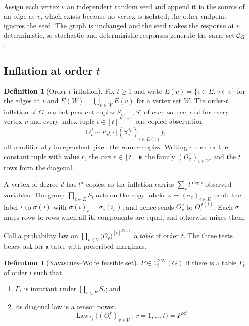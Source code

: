 \documentclass[11pt]{article}
\theoremstyle{plain}
\theoremstyle{definition}
\newtheorem{definition}[theorem]{Definition}
\DeclareMathOperator{\Law}{Law}
\newcommand{\INW}{\mathcal I^{\mathrm{NW}}}
\begin{document}
Assign each vertex $v$ an independent random seed and append it to the source of an edge at $v$, which exists because no vertex is isolated; the other endpoint ignores the seed. The graph is unchanged and the seed makes the response at $v$ deterministic, so stochastic and deterministic responses generate the same set $\mathcal C_{G}$ \cite{WSF2019}.

\subsection{Inflation at order \texorpdfstring{$t$}{t}}

\begin{definition}[Order-$t$ inflation]\label{def:ginflation}
Fix $t\ge1$ and write $E(v)=\{e\in E:v\in e\}$ for the edges at $v$ and $E(W)=\bigcup_{v\in W}E(v)$ for a vertex set $W$. The order-$t$ inflation of $G$ has independent copies $S_e^1,\dots,S_e^t$ of each source, and for every vertex $v$ and every index tuple $i\in[t]^{E(v)}$ one copied observation
\[
O_v^{\,i}\sim\kappa_v\bigl(\cdot\mid(S_e^{\,i_e})_{e\in E(v)}\bigr),
\]
all conditionally independent given the source copies. Writing $r$ also for the constant tuple with value $r$, the \emph{row} $r\in[t]$ is the family $(O_v^{\,r})_{v\in V}$, and the $t$ rows form the diagonal.
\end{definition}

A vertex of degree $d$ has $t^d$ copies, so the inflation carries $\sum_v t^{\deg v}$ observed variables. The group $\prod_{e\in E}S_t$ acts on the copy labels: $\sigma=(\sigma_e)_{e\in E}$ sends the label $i$ to $\sigma(i)$ with $\sigma(i)_e=\sigma_e(i_e)$, and hence sends $O_v^{\,i}$ to $O_v^{\,\sigma(i)}$. Each $\sigma$ maps rows to rows when all its components are equal, and otherwise mixes them.

Call a probability law on $\prod_{v\in V}\bigl(\mathcal O_v\bigr)^{[t]^{E(v)}}$ a \emph{table} of order $t$. The three tests below ask for a table with prescribed marginals.

\begin{definition}[Navascués--Wolfe feasible set]\label{def:gNW}\label{def:NW}
$P\in\INW_t(G)$ if there is a table $\Gamma_t$ of order $t$ such that
\begin{enumerate}[label=(\roman*),nosep]
\item $\Gamma_t$ is invariant under $\prod_{e\in E}S_t$; and
\item its diagonal law is a tensor power,
\[
\Law_{\Gamma_t}\bigl((O_v^{\,r})_{v\in V}\ :\ r=1,\dots,t\bigr)=P^{\otimes t}.
\]
\end{enumerate}
\end{definition}
\end{document}
